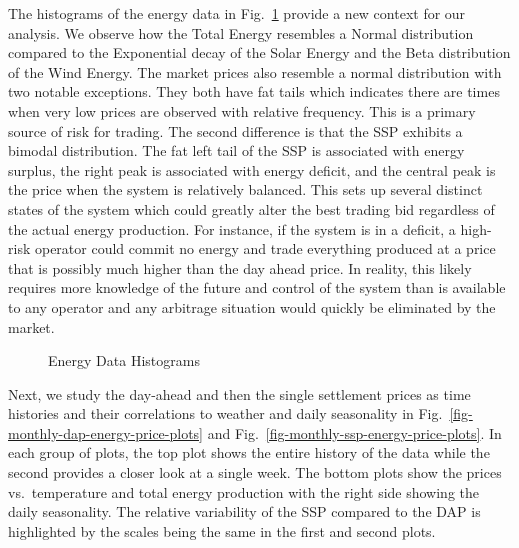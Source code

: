 \documentclass[
  journal,
]{IEEEtran}%
\begin{document}
The histograms of the energy data in
Fig.~\ref{fig-energy-data-summary-histogram} provide a new context for
our analysis. We observe how the Total Energy resembles a Normal
distribution compared to the Exponential decay of the Solar Energy and
the Beta distribution of the Wind Energy. The market prices also
resemble a normal distribution with two notable exceptions. They both
have fat tails which indicates there are times when very low prices are
observed with relative frequency. This is a primary source of risk for
trading. The second difference is that the SSP exhibits a bimodal
distribution. The fat left tail of the SSP is associated with energy
surplus, the right peak is associated with energy deficit, and the
central peak is the price when the system is relatively balanced. This
sets up several distinct states of the system which could greatly alter
the best trading bid regardless of the actual energy production. For
instance, if the system is in a deficit, a high-risk operator could
commit no energy and trade everything produced at a price that is
possibly much higher than the day ahead price. In reality, this likely
requires more knowledge of the future and control of the system than is
available to any operator and any arbitrage situation would quickly be
eliminated by the market.

\begin{figure}


\caption{\label{fig-energy-data-summary-histogram}Energy Data
Histograms}

\end{figure}%

Next, we study the day-ahead and then the single settlement prices as
time histories and their correlations to weather and daily seasonality
in Fig.~\ref{fig-monthly-dap-energy-price-plots} and
Fig.~\ref{fig-monthly-ssp-energy-price-plots}. In each group of plots,
the top plot shows the entire history of the data while the second
provides a closer look at a single week. The bottom plots show the
prices vs.~temperature and total energy production with the right side
showing the daily seasonality. The relative variability of the SSP
compared to the DAP is highlighted by the scales being the same in the
first and second plots.
\end{document}
